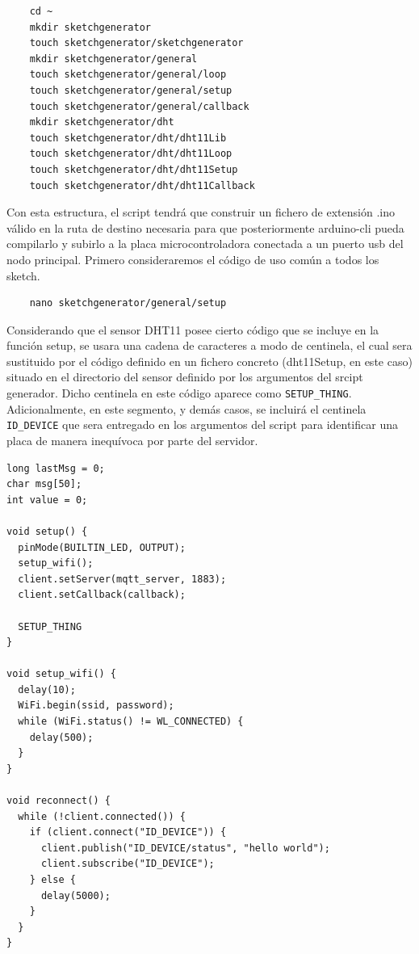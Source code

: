 \begin{verbatim}
    cd ~
    mkdir sketchgenerator
    touch sketchgenerator/sketchgenerator
    mkdir sketchgenerator/general
    touch sketchgenerator/general/loop
    touch sketchgenerator/general/setup
    touch sketchgenerator/general/callback
    mkdir sketchgenerator/dht
    touch sketchgenerator/dht/dht11Lib
    touch sketchgenerator/dht/dht11Loop
    touch sketchgenerator/dht/dht11Setup
    touch sketchgenerator/dht/dht11Callback
\end{verbatim}

Con esta estructura, el \gls{script} tendrá que construir un fichero de extensión .ino válido en la ruta de destino necesaria para que posteriormente arduino-cli pueda compilarlo y subirlo a la placa microcontroladora conectada a un puerto \gls{usb} del nodo principal. Primero consideraremos el código de uso común a todos los \gls{sketch}.

\begin{verbatim}
    nano sketchgenerator/general/setup
\end{verbatim}

Considerando que el sensor DHT11 posee cierto código que se incluye en la función setup, se usara una cadena de caracteres a modo de centinela, el cual sera sustituido por el código definido en un fichero concreto (dht11Setup, en este caso) situado en el directorio del sensor definido por los argumentos del srcipt generador. Dicho centinela en este código aparece como \verb|SETUP_THING|. Adicionalmente, en este segmento, y demás casos, se incluirá el centinela \verb|ID_DEVICE| que sera entregado en los argumentos del script para identificar una placa de manera inequívoca por parte del servidor.

\begin{verbatim}
long lastMsg = 0;
char msg[50];
int value = 0;

void setup() {
  pinMode(BUILTIN_LED, OUTPUT);
  setup_wifi();
  client.setServer(mqtt_server, 1883);
  client.setCallback(callback);

  SETUP_THING
}

void setup_wifi() {
  delay(10);
  WiFi.begin(ssid, password);
  while (WiFi.status() != WL_CONNECTED) {
    delay(500);
  }
}

void reconnect() {
  while (!client.connected()) {
    if (client.connect("ID_DEVICE")) {
      client.publish("ID_DEVICE/status", "hello world");
      client.subscribe("ID_DEVICE");
    } else {
      delay(5000);
    }
  }
}
\end{verbatim}

